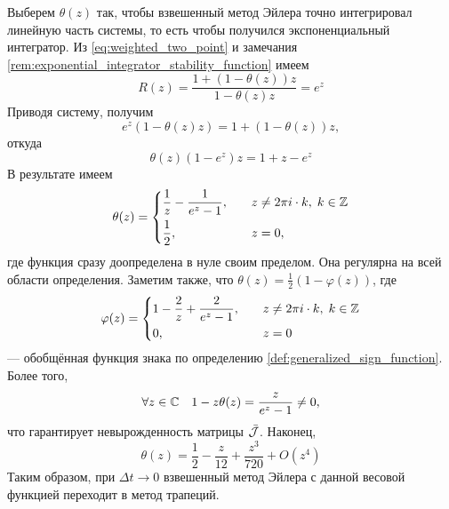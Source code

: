 Выберем $ \theta(z) $ так, чтобы взвешенный метод Эйлера точно интегрировал линейную часть системы,
то есть чтобы получился экспоненциальный интегратор.
Из \eqref{eq:weighted_two_point} и замечания \ref{rem:exponential_integrator_stability_function} имеем
\[
    R(z) = \frac{1 + (1 - \theta(z)) z}{1 - \theta(z) z} = e^z
\]
Приводя систему, получим
\[
    e^z (1 - \theta(z) z) = 1 + (1 - \theta(z)) z,
\]
откуда
\[
    \theta(z) \left( 1 - e^z \right) z = 1 + z - e^z
\]
В результате имеем
\begin{equation}
    \label{eq:exponential_integrator_weight}
    \theta(z) =
    \begin{dcases}
        \frac{1}{z} - \frac{1}{e^z - 1}, &\quad z \neq 2 \pi i \cdot k, \; k \in \mathbb{Z} \\
        \frac{1}{2}, &\quad z = 0,
    \end{dcases}
\end{equation}
где функция сразу доопределена в нуле своим пределом.
Она регулярна на всей области определения.
Заметим также, что $ \theta(z) = \frac{1}{2} (1 - \varphi(z)) $, где
\begin{equation}
    \label{eq:exponential_integrator_sign}
    \varphi(z) =
    \begin{dcases}
        1 - \frac{2}{z} + \frac{2}{e^z - 1}, &\quad z \neq 2 \pi i \cdot k, \; k \in \mathbb{Z} \\
        0, &\quad z = 0
    \end{dcases}
\end{equation}
--- обобщённая функция знака по определению \ref{def:generalized_sign_function}.
Более того,
\[
    \forall z \in \mathbb{C} \quad 1 - z \theta(z) = \frac{z}{e^z - 1} \neq 0,
\]
что гарантирует невырожденность матрицы $ \bar{\mathcal{J}} $.
Наконец,
\begin{equation}
    \label{eq:exponential_integrator_weight_series}
    \theta(z) = \frac{1}{2} - \frac{z}{12} + \frac{z^3}{720} + O(z^4)
\end{equation}
Таким образом, при $ \Delta t \to 0 $ взвешенный метод Эйлера с данной весовой функцией переходит в метод трапеций.
